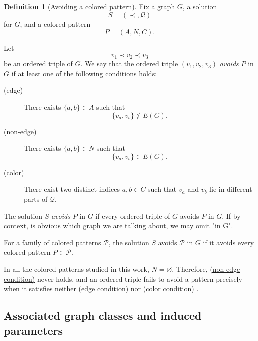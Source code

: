 \documentclass[12pt]{article}
\theoremstyle{plain}
\theoremstyle{definition}
\newtheorem{definition}[theorem]{Definition}
\theoremstyle{remark}
\theoremstyle{definition}
\newcommand{\edgecondition}{%
  \hyperref[def:avoid:cond:edge]{(edge condition)}\xspace
}
\newcommand{\nonedgecondition}{%
  \hyperref[def:avoid:cond:nonedge]{(non-edge condition)}\xspace
}
\newcommand{\colorcondition}{%
  \hyperref[def:avoid:cond:color]{(color condition)}\xspace
}
\begin{document}
\begin{definition}[Avoiding a colored pattern]\label{def:avoiding-colored-pattern}
Fix a graph \(G\), a solution
\[
S=(\prec,\mathcal Q)
\]
for \(G\), and a colored pattern
\[
P=(A,N,C).
\]

Let
\[
v_1\prec v_2\prec v_3
\]
be an ordered triple of \(G\). We say that the ordered triple \((v_1,v_2,v_3)\) \emph{avoids} \(P\) in \(G\) if at least one of the following
conditions holds:

\begin{description}
\item[\textup{(edge)}]\label{def:avoid:cond:edge}
There exists \(\{a,b\}\in A\) such that
\[
\{v_a,v_b\}\notin E(G).
\]

\item[\textup{(non-edge)}]\label{def:avoid:cond:nonedge}
There exists \(\{a,b\}\in N\) such that
\[
\{v_a,v_b\}\in E(G).
\]
\end{description}

\begin{description}
\item[\textup{(color)}]\label{def:avoid:cond:color}
There exist two distinct indices \(a,b\in C\) such that \(v_a\) and \(v_b\) lie in different parts of
\(\mathcal Q\).
\end{description}


The solution \(S\) \emph{avoids} \(P\) in \(G\) if every ordered triple of \(G\) avoids \(P\) in \(G\).
If by context, is obvious which graph we are talking about, we may omit "in G".

For a family of colored patterns \(\mathcal P\), the solution \(S\) avoids \(\mathcal P\) in \(G\) if it avoids every
colored pattern \(P\in\mathcal P\).


In all the colored patterns studied in this work, \(N=\varnothing\). Therefore, \nonedgecondition{} never holds, and an ordered triple fails to avoid a pattern precisely when it satisfies neither \edgecondition{} nor \colorcondition{}.

\end{definition}





\subsection{Associated graph classes and induced parameters}
\label{subsec:induced-parameters}
\end{document}
